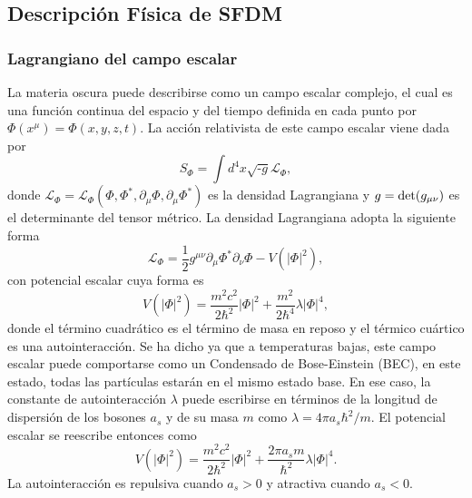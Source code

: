 \documentclass[a4paper,openright,12pt]{book}
\begin{document}
\subsection{Descripción Física de SFDM}
\subsubsection{Lagrangiano del campo escalar}
La materia oscura puede describirse como un campo escalar complejo, el cual es una función continua del espacio y del tiempo definida en cada punto por $\Phi(x^{\mu}) = \Phi(x, y, z, t) $. La acción relativista de este campo escalar viene dada por \cite{1.3.03.1} \begin{equation}
S_{\Phi} = \int d^{4}x\sqrt{\textbf{-} g}\mathcal{L}_{\Phi},\label{1.54}
\end{equation}
donde $\mathcal{L}_{\Phi} = \mathcal{L}_{\Phi}(\Phi, \Phi^{*},\partial_{\mu}\Phi,\partial_{\mu}\Phi^{*})$ es la densidad Lagrangiana y $g= \textup{det}(g_{\mu\nu})$ es el determinante del tensor métrico. La densidad Lagrangiana adopta la siguiente forma
\begin{equation}
\mathcal{L}_{\Phi} = \frac{1}{2}g^{\mu\nu}\partial_{\mu}\Phi^{*}\partial_{\nu}\Phi - V(|\Phi|^{2}),\label{1.55}
\end{equation}
con potencial escalar cuya forma es 
\begin{equation}
V(|\Phi|^{2}) = \frac{m^{2}c^{2}}{2\hbar^{2}}|\Phi|^{2} + \frac{m^{2}}{2\hbar^{4}}\lambda|\Phi|^{4},\label{1.56}
\end{equation}
donde el término cuadrático es el término de masa en reposo y el térmico cuártico es una autointeracción. Se ha dicho ya que a temperaturas bajas, este campo escalar puede comportarse como un Condensado de Bose-Einstein (BEC), en este estado, todas las partículas estarán en el mismo estado base. En ese caso, la constante de autointeracción $\lambda$ puede escribirse en términos de la longitud de dispersión  de los bosones $a_{s}$ y de su masa $m$ como $\lambda = 4\pi a_{s}\hbar^{2}/m $. El potencial escalar se reescribe entonces como
\begin{equation}
V(|\Phi|^{2}) = \frac{m^{2}c^{2}}{2\hbar^{2}}|\Phi|^{2} + \frac{2\pi a_{s}m}{\hbar^{2}}\lambda|\Phi|^{4}.\label{1.57}
\end{equation}
La autointeracción es repulsiva cuando $a_{s} > 0$ y atractiva cuando $a_{s} < 0$.
\end{document}
